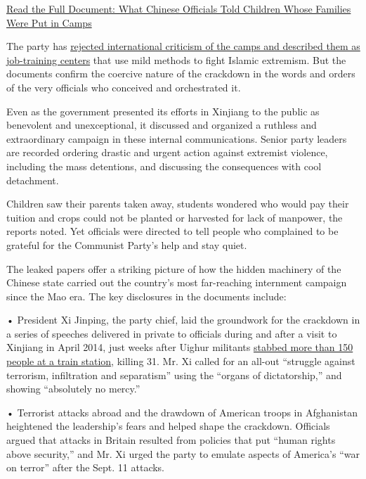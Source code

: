 \href{https://www.nytimes3xbfgragh.onion/interactive/2019/11/16/world/asia/china-detention-directive.html}{Read
the Full Document: What Chinese Officials Told Children Whose Families
Were Put in Camps}

The party has
\href{https://www.nytimes3xbfgragh.onion/2019/03/12/world/asia/china-xinjiang.html}{rejected
international criticism of the camps and described them as job-training
centers} that use mild methods to fight Islamic extremism. But the
documents confirm the coercive nature of the crackdown in the words and
orders of the very officials who conceived and orchestrated it.

Even as the government presented its efforts in Xinjiang to the public
as benevolent and unexceptional, it discussed and organized a ruthless
and extraordinary campaign in these internal communications. Senior
party leaders are recorded ordering drastic and urgent action against
extremist violence, including the mass detentions, and discussing the
consequences with cool detachment.

Children saw their parents taken away, students wondered who would pay
their tuition and crops could not be planted or harvested for lack of
manpower, the reports noted. Yet officials were directed to tell people
who complained to be grateful for the Communist Party's help and stay
quiet.

The leaked papers offer a striking picture of how the hidden machinery
of the Chinese state carried out the country's most far-reaching
internment campaign since the Mao era. The key disclosures in the
documents include:

• President Xi Jinping, the party chief, laid the groundwork for the
crackdown in a series of speeches delivered in private to officials
during and after a visit to Xinjiang in April 2014, just weeks after
Uighur militants
\href{https://www.nytimes3xbfgragh.onion/2015/03/25/world/asia/china-executes-3-over-deadly-knife-attack-at-train-station-in-2014.html}{stabbed
more than 150 people at a train station}, killing 31. Mr. Xi called for
an all-out ``struggle against terrorism, infiltration and separatism''
using the ``organs of dictatorship,'' and showing ``absolutely no
mercy.''

• Terrorist attacks abroad and the drawdown of American troops in
Afghanistan heightened the leadership's fears and helped shape the
crackdown. Officials argued that attacks in Britain resulted from
policies that put ``human rights above security,'' and Mr. Xi urged the
party to emulate aspects of America's ``war on terror'' after the Sept.
11 attacks.

